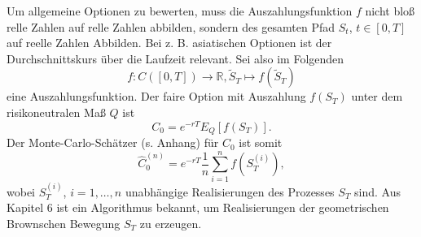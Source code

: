 \begin{lemma}
Um allgemeine Optionen zu bewerten, muss die Auszahlungsfunktion $f$
nicht bloß relle Zahlen auf relle Zahlen abbilden, sondern des gesamten Pfad
$S_t$, $t\in[0,T]$ auf reelle Zahlen Abbilden. Bei z. B. asiatischen Optionen ist
der Durchschnittskurs über die Laufzeit relevant.
Sei also im Folgenden 
$$f: C([0,T]) \to \mathbb R, \tilde S_T \mapsto f(\tilde S_T)$$
eine Auszahlungsfunktion. Der faire Option mit Auszahlung $f(S_T)$
unter dem risikoneutralen Maß $Q$ ist
$$
C_0 = e^{-rT} E_Q[f(S_T)].
$$
Der Monte-Carlo-Schätzer (s. Anhang) für $C_0$ ist somit
$$
\hat{C}_0^{(n)} = e^{-rT} \frac{1}{n} \sum_{i=1}^n f(S_T^{(i)}),
$$
wobei $S_T^{(i)}$, $i=1,\ldots,n$ unabhängige Realisierungen des Prozesses $S_T$ sind. Aus Kapitel 6 ist
ein Algorithmus bekannt, um Realisierungen der geometrischen Brownschen Bewegung $S_T$ zu erzeugen.

\end{lemma}


